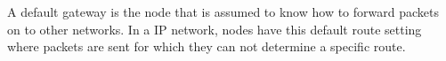 A default gateway is the node that is assumed to know how to forward packets on to other networks. In a IP network, nodes have this default route setting where packets are sent for which they can not determine a specific route. 